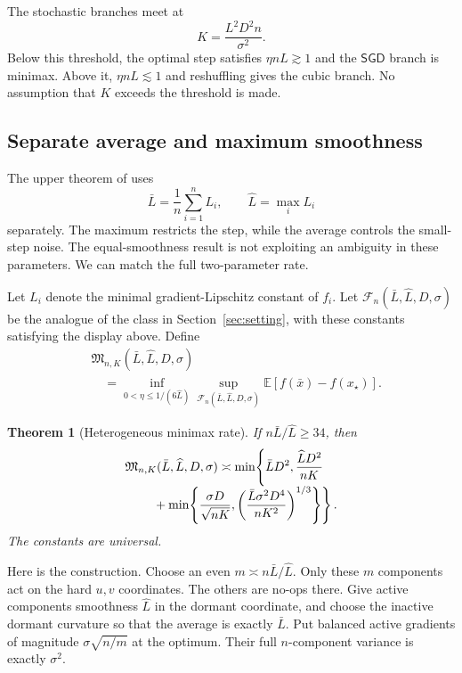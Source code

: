 \documentclass[twoside]{article}
\newtheorem{theorem}{Theorem}
\newcommand{\E}{\mathbb E}
\newcommand{\cF}{\mathcal F}
\newcommand{\SGD}{\mathsf{SGD}}
\begin{document}
The stochastic branches meet at
\begin{equation}
 K=\frac{L^2D^2n}{\sigma^2}.
 \label{eq:transition}
\end{equation}
Below this threshold, the optimal step satisfies $\eta nL\gtrsim1$ and the
$\SGD$ branch is minimax. Above it, $\eta nL\lesssim1$ and reshuffling gives
the cubic branch. No assumption that $K$ exceeds the threshold is made.

\subsection{Separate average and maximum smoothness}
\label{sec:heterogeneous}

The upper theorem of \citet{liu2026dominates} uses
\[
 \bar L=\frac1n\sum_{i=1}^nL_i,
 \qquad \widehat L=\max_iL_i
\]
separately. The maximum restricts the step, while the average controls the
small-step noise. The equal-smoothness result is not exploiting an ambiguity
in these parameters. We can match the full two-parameter rate.

Let $L_i$ denote the minimal gradient-Lipschitz constant of $f_i$. Let
$\cF_n(\bar L,\widehat L,D,\sigma)$ be the analogue of the class in
Section~\ref{sec:setting}, with these constants satisfying the display above.
Define
\begin{equation}
\begin{aligned}
 &\mathfrak M_{n,K}(\bar L,\widehat L,D,\sigma)\\
 &\quad=\inf_{0<\eta\le1/(6\widehat L)}
 \sup_{\cF_n(\bar L,\widehat L,D,\sigma)}
 \E[f(\bar x)-f(x_\star)].
\end{aligned}
 \label{eq:minimax-hetero}
\end{equation}

\begin{theorem}[Heterogeneous minimax rate]
\label{thm:heterogeneous}
If $n\bar L/\widehat L\ge34$, then
\begin{align}
 \mathfrak M_{n,K}(\bar L,\widehat L,D,\sigma)
 \asymp
 \min\!\left\{\bar LD^2,\frac{\widehat LD^2}{nK}\right.\quad\notag\\[-1ex]
 \left.{}+\min\!\left\{
 \frac{\sigma D}{\sqrt{nK}},
 \left(\frac{\bar L\sigma^2D^4}{nK^2}\right)^{1/3}
 \right\}\right\}.
 \label{eq:minimax-hetero-rate}
\end{align}
The constants are universal.
\end{theorem}

Here is the construction. Choose an even
$m\asymp n\bar L/\widehat L$. Only these $m$ components act on the hard
$u,v$ coordinates. The others are no-ops there. Give active components
smoothness $\widehat L$ in the dormant coordinate, and choose the inactive
dormant curvature so that the average is exactly $\bar L$. Put balanced active
gradients of magnitude $\sigma\sqrt{n/m}$ at the optimum. Their full
$n$-component variance is exactly $\sigma^2$.
\end{document}
